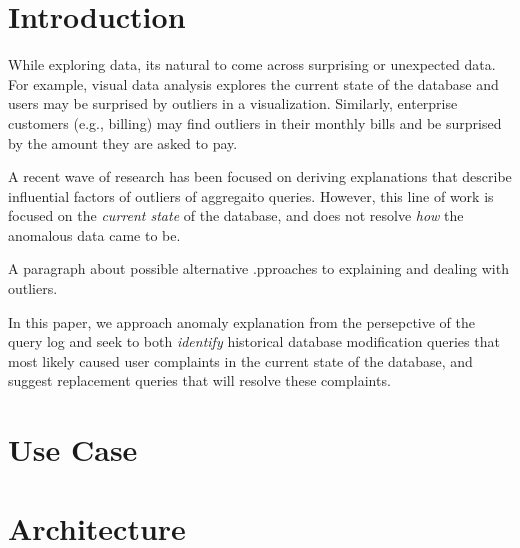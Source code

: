 
\section{Introduction}

While exploring data, its natural to come across surprising or unexpected data.
For example, visual data analysis explores the current state of the database and users may be surprised by outliers in a visualization.
Similarly, enterprise customers (e.g., billing) may find outliers in their monthly bills and be surprised by the amount they are asked to pay.

A recent wave of research has been focused on deriving explanations that describe influential factors of outliers of aggregaito queries.
However, this line of work is focused on the {\it current state} of the database, and does not resolve {\it how} the anomalous data came to be.


A paragraph about possible alternative .pproaches to explaining and dealing with outliers.

In this paper, we approach anomaly explanation from the persepctive of the query log and seek to
both {\it identify}  historical database modification queries that most likely caused user complaints 
in the current state of the database, and suggest replacement queries that will resolve these complaints.



\section{Use Case}

\section{Architecture}









